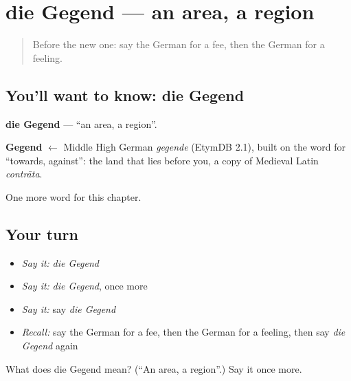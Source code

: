 \section[die Gegend]{die Gegend — an area, a region}

\label{lesson:GE-C229-gegend}



\begin{quote}
Before the new one: say the German for a fee, then the German for a feeling.
\end{quote}

\subsection*{You'll want to know: die Gegend}
\textbf{die Gegend} — \textquotedblleft{}an area, a region\textquotedblright{}.

\begin{cousinweb}
\textbf{Gegend} $\leftarrow$ Middle High German \emph{gegende} (EtymDB 2.1), built on the word for \textquotedblleft{}towards, against\textquotedblright{}: the land that lies before you, a copy of Medieval Latin \emph{contrāta}.
\end{cousinweb}

\begin{grammarlens}[title={What you've built}]
One more word for this chapter.
\end{grammarlens}

\subsection*{Your turn}
\begin{itemize}
\raggedright
  \item \emph{Say it:} \emph{die Gegend}
  \item \emph{Say it:} \emph{die Gegend}, once more
  \item \emph{Say it:} say \emph{die Gegend}
  \item \emph{Recall:} say the German for a fee, then the German for a feeling, then say \emph{die Gegend} again
\end{itemize}

\begin{tcolorbox}[breakable,colback=teal!4,colframe=teal!35!black,title={Before you move on}]
What does die Gegend mean? (\textquotedblleft{}An area, a region\textquotedblright{}.) Say it once more.
\end{tcolorbox}
